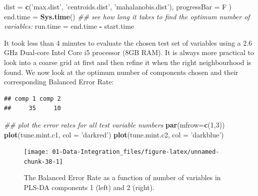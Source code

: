 \documentclass[]{book}
\newenvironment{Shaded}{\begin{snugshade}}{\end{snugshade}}
\newcommand{\CommentTok}[1]{\textcolor[rgb]{0.56,0.35,0.01}{\textit{#1}}}
\newcommand{\DataTypeTok}[1]{\textcolor[rgb]{0.13,0.29,0.53}{#1}}
\newcommand{\DecValTok}[1]{\textcolor[rgb]{0.00,0.00,0.81}{#1}}
\newcommand{\KeywordTok}[1]{\textcolor[rgb]{0.13,0.29,0.53}{\textbf{#1}}}
\newcommand{\NormalTok}[1]{#1}
\newcommand{\OperatorTok}[1]{\textcolor[rgb]{0.81,0.36,0.00}{\textbf{#1}}}
\newcommand{\StringTok}[1]{\textcolor[rgb]{0.31,0.60,0.02}{#1}}
\theoremstyle{definition}
\theoremstyle{definition}
\theoremstyle{definition}
\theoremstyle{remark}
\begin{document}
\begin{Shaded}
\begin{Highlighting}[]
  \DataTypeTok{dist =} \KeywordTok{c}\NormalTok{(}\StringTok{'max.dist'}\NormalTok{,  }\StringTok{'centroids.dist'}\NormalTok{, }\StringTok{'mahalanobis.dist'}\NormalTok{),}
  \DataTypeTok{progressBar =}\NormalTok{ F}
\NormalTok{)}
\NormalTok{end.time =}\StringTok{ }\KeywordTok{Sys.time}\NormalTok{()}
\CommentTok{## see how long it takes to find the optimum number of variables:}
\NormalTok{run.time =}\StringTok{  }\NormalTok{end.time }\OperatorTok{-}\StringTok{ }\NormalTok{start.time}
\end{Highlighting}
\end{Shaded}

It took less than 4 minutes to evaluate the chosen test set of variables
using a 2.6 GHz Dual-core Intel Core i5 processor (8GB RAM). It is
always more practical to look into a coarse grid at first and then
refine it when the right neighbourhood is found. We now look at the
optimum number of components chosen and their corresponding Balanced
Error Rate:

\begin{Shaded}
\end{Shaded}

\begin{verbatim}
## comp 1 comp 2 
##     35     10
\end{verbatim}

\begin{Shaded}
\begin{Highlighting}[]
\CommentTok{## plot the error rates for all test variable numbers}
\KeywordTok{par}\NormalTok{(}\DataTypeTok{mfrow=}\KeywordTok{c}\NormalTok{(}\DecValTok{1}\NormalTok{,}\DecValTok{3}\NormalTok{))}
\KeywordTok{plot}\NormalTok{(tune.mint.c1, }\DataTypeTok{col =} \StringTok{'darkred'}\NormalTok{)}
\KeywordTok{plot}\NormalTok{(tune.mint.c2, }\DataTypeTok{col =} \StringTok{'darkblue'}\NormalTok{)}
\end{Highlighting}
\end{Shaded}

\begin{figure}[ht]

\texttt{[image: 01-Data-Integration\_files/figure-latex/unnamed-chunk-38-1]} \hfill{}

\caption{The Balanced Error Rate as a function of number of variables in PLS-DA components 1 (left) and 2 (right). }\label{fig:unnamed-chunk-38}
\end{figure}
\end{document}
